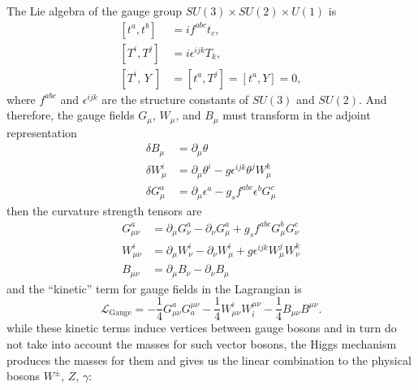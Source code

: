 The Lie algebra of the gauge group $SU(3)\times SU(2)\times U(1)$ is
\begin{equation}
\begin{aligned}
	{\left[t^{a}, t^{b}\right] } &=i f^{a b c} t_{c}, \\
	{\left[T^{i}, T^{j}\right] } &=i \epsilon^{i j k} T_{k}, \\
	{\left[T^{i}, \, Y\;\right] } &=\left[t^{a}, T^{j}\right]=\left[t^{a}, Y\right]=0,
\end{aligned}
\end{equation}
where $f^{a b c}$ and $\epsilon^{i j k}$ are the structure constants of $SU(3)$ and $SU(2)$. And therefore, the gauge fields $G_\mu$, $W_\mu$, and $B_\mu$ must transform in the adjoint representation 
\begin{equation}
	\begin{aligned}
		\delta B_{\mu} &=\partial_{\mu} \theta \\
		\delta W_{\mu}^{i} &=\partial_{\mu} \theta^{i}-g \epsilon^{i j k} \theta^{j} W_{\mu}^{k} \\
		\delta G_{\mu}^{a} &=\partial_{\mu} \epsilon^{a}-g_{s} f^{a b c} \epsilon^{b} G_{\mu}^{c}
	\end{aligned}
\end{equation}
then the curvature strength tensors are
\begin{equation}
\begin{aligned}
	G_{\mu \nu}^{a} &=\partial_{\mu} G_{\nu}^{a}-\partial_{\nu} G_{\mu}^{a}+g_{s} f^{a b c} G_{\mu}^{b} G_{\nu}^{c} \\
	W_{\mu \nu}^{i} &=\partial_{\mu} W_{\nu}^{i}-\partial_{\nu} W_{\mu}^{i}+g \epsilon^{i j k} W_{\mu}^{j} W_{\nu}^{k} \\
	B_{\mu \nu} &=\partial_{\mu} B_{\nu}-\partial_{\nu} B_{\mu}
\end{aligned}
\end{equation}
and the ``kinetic'' term for gauge fields in the Lagrangian is  
\begin{equation}
\mathcal{L}_{\text{Gauge}}=-\frac{1}{4} G_{\mu \nu}^{a} G_{a}^{\mu \nu}-\frac{1}{4} W_{\mu \nu}^{i} W_{i}^{\mu \nu}-\frac{1}{4} B_{\mu \nu} B^{\mu \nu}.
\end{equation}
while these kinetic terms induce vertices between gauge bosons and in turn do not take into account the masses for such vector bosons, the Higgs mechanism produces the masses for them and gives us the linear combination to the physical bosons $W^\pm$, $Z$, $\gamma$:
